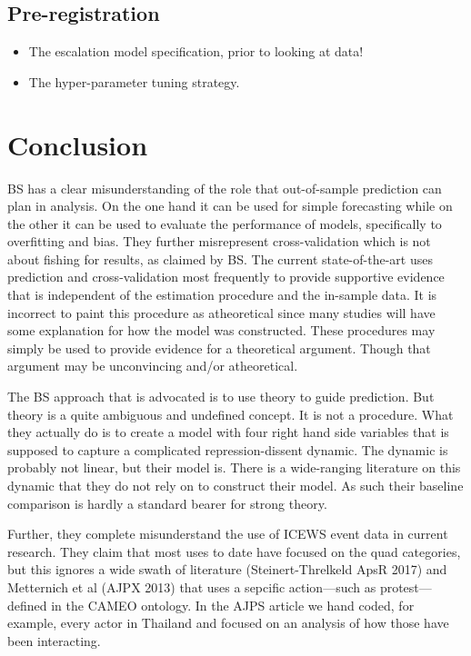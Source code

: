 \documentclass[]{article}
\providecommand{\tightlist}{%
  \setlength{\itemsep}{0pt}\setlength{\parskip}{0pt}}
\begin{document}
\hypertarget{pre-registration}{%
\subsection{Pre-registration}\label{pre-registration}}

\begin{itemize}
\tightlist
\item
  The escalation model specification, prior to looking at data!
\item
  The hyper-parameter tuning strategy.
\end{itemize}

\hypertarget{conclusion}{%
\section{Conclusion}\label{conclusion}}

BS has a clear misunderstanding of the role that out-of-sample
prediction can plan in analysis. On the one hand it can be used for
simple forecasting while on the other it can be used to evaluate the
performance of models, specifically to overfitting and bias. They
further misrepresent cross-validation which is not about fishing for
results, as claimed by BS. The current state-of-the-art uses prediction
and cross-validation most frequently to provide supportive evidence that
is independent of the estimation procedure and the in-sample data. It is
incorrect to paint this procedure as atheoretical since many studies
will have some explanation for how the model was constructed. These
procedures may simply be used to provide evidence for a theoretical
argument. Though that argument may be unconvincing and/or atheoretical.

The BS approach that is advocated is to use theory to guide prediction.
But theory is a quite ambiguous and undefined concept. It is not a
procedure. What they actually do is to create a model with four right
hand side variables that is supposed to capture a complicated
repression-dissent dynamic. The dynamic is probably not linear, but
their model is. There is a wide-ranging literature on this dynamic that
they do not rely on to construct their model. As such their baseline
comparison is hardly a standard bearer for strong theory.

Further, they complete misunderstand the use of ICEWS event data in
current research. They claim that most uses to date have focused on the
quad categories, but this ignores a wide swath of literature
(Steinert-Threlkeld ApsR 2017) and Metternich et al (AJPX 2013) that
uses a sepcific action---such as protest---defined in the CAMEO
ontology. In the AJPS article we hand coded, for example, every actor in
Thailand and focused on an analysis of how those have been interacting.
\end{document}
